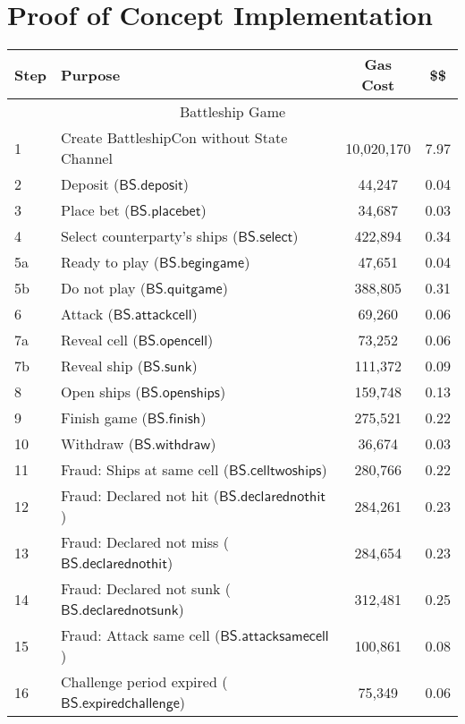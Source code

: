 \documentclass{llncs}
\newcommand{\battleshipattackcell}{\mathsf{BS.attackcell}}
\newcommand{\battleshipbegin}{\mathsf{BS.begingame}}
\newcommand{\battleshipquit}{\mathsf{BS.quitgame}}
\newcommand{\battleshipplacebet}{\mathsf{BS.placebet}}
\newcommand{\battleshipselectboard}{\mathsf{BS.select}}
\newcommand{\battleshiprevealcell}{\mathsf{BS.opencell}}
\newcommand{\battleshipsinking}{\mathsf{BS.sunk}}
\newcommand{\battleshiprevealboard}{\mathsf{BS.openships}}
\newcommand{\battleshipdeposit}{\mathsf{BS.deposit}}
\newcommand{\battleshipwithdraw}{\mathsf{BS.withdraw}}
\newcommand{\battleshipfinish}{\mathsf{BS.finish}}
\newcommand{\battleshipdeclarednotsunk}{\mathsf{BS.declarednotsunk}}
\newcommand{\battleshipdeclarednothit}{\mathsf{BS.declarednothit}}
\newcommand{\battleshipsamecell}{\mathsf{BS.attacksamecell}}
\newcommand{\battleshiptwoships}{\mathsf{BS.celltwoships}}
\newcommand{\battleshipchallengeexpired}{\mathsf{BS.expiredchallenge}}
\begin{document}
	\section{Proof of Concept Implementation}
	
		\begin{table}
		\centering
		\begin{tabular}[]{l l c c}
			
			\textbf{Step} & \textbf{Purpose} & \textbf{Gas Cost} & \textbf{\$\$}  \\ 
			\hline
			\multicolumn{4}{c}{Battleship Game} \\
			\hline
			1 & Create BattleshipCon without State Channel & 10,020,170 & 7.97 \\
			2 & Deposit ($\battleshipdeposit$) & 44,247 & 0.04 \\
			3 & Place bet ($\battleshipplacebet$)& 34,687 & 0.03 \\
			4 & Select counterparty's ships ($\battleshipselectboard$) & 422,894 & 0.34 \\ 
			5a & Ready to play ($\battleshipbegin$) & 47,651 & 0.04 \\
			5b & Do not play ($\battleshipquit$) & 388,805 & 0.31 \\
			6 & Attack ($\battleshipattackcell$) & 69,260 & 0.06 \\
			7a & Reveal cell ($\battleshiprevealcell$) & 73,252 & 0.06 \\
			7b & Reveal ship ($\battleshipsinking$)& 111,372 & 0.09  \\
			8 & Open ships ($\battleshiprevealboard$) & 159,748 & 0.13 \\
			9 & Finish game ($\battleshipfinish$) & 275,521 & 0.22 \\
			10 & Withdraw ($\battleshipwithdraw$) & 36,674 & 0.03 \\ 
			11 & Fraud: Ships at same cell ($\battleshiptwoships$) & 280,766 & 0.22\\
			12 & Fraud: Declared not hit ($\battleshipdeclarednothit$) & 284,261 & 0.23 \\
			13 & Fraud: Declared not miss ($\battleshipdeclarednothit$) & 284,654 & 0.23 \\
			14 & Fraud: Declared not sunk ($\battleshipdeclarednotsunk$) & 312,481 & 0.25 \\
			15 & Fraud: Attack same cell ($\battleshipsamecell$) & 100,861 & 0.08 \\
			16 & Challenge period expired ($\battleshipchallengeexpired$) &75,349 & 0.06 \\

\end{tabular}
\end{table}
\end{document}
